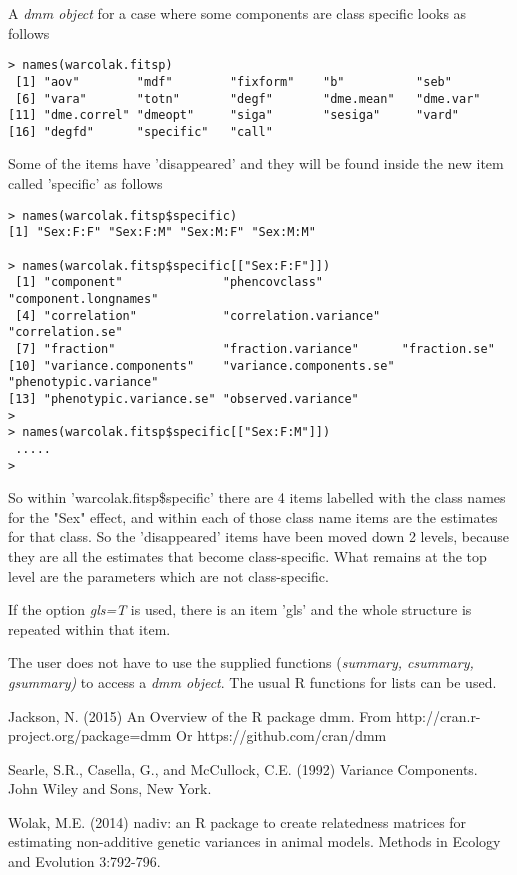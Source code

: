 \documentclass[titlepage]{article}  %
\begin{document}
A {\em dmm object} for a case where some components are class specific looks as follows
\begin{verbatim}
> names(warcolak.fitsp)
 [1] "aov"        "mdf"        "fixform"    "b"          "seb"       
 [6] "vara"       "totn"       "degf"       "dme.mean"   "dme.var"   
[11] "dme.correl" "dmeopt"     "siga"       "sesiga"     "vard"      
[16] "degfd"      "specific"   "call"  
\end{verbatim}
Some of the items have 'disappeared' and they will be found inside the new item called 'specific' as follows
\begin{verbatim}
> names(warcolak.fitsp$specific)
[1] "Sex:F:F" "Sex:F:M" "Sex:M:F" "Sex:M:M"

> names(warcolak.fitsp$specific[["Sex:F:F"]])
 [1] "component"              "phencovclass"           "component.longnames"   
 [4] "correlation"            "correlation.variance"   "correlation.se"        
 [7] "fraction"               "fraction.variance"      "fraction.se"           
[10] "variance.components"    "variance.components.se" "phenotypic.variance"   
[13] "phenotypic.variance.se" "observed.variance"     
> 
> names(warcolak.fitsp$specific[["Sex:F:M"]])
 .....
>
\end{verbatim}
 So within 'warcolak.fitsp\$specific' there are 4 items labelled with the class names for the "Sex" effect, and within each of those class name items are the 
estimates for that class. So the 'disappeared' items have been moved down 2 levels, because they are all the estimates that become class-specific. What remains at the top level are the parameters which are not class-specific. 

If the option {\em gls=T} is used, there is an item 'gls' and the whole structure is repeated within that item.

The user does not have to use the supplied functions ({\em summary, csummary, gsummary)} to access a {\em dmm object}. The usual R functions for lists can be used.



\begin{thebibliography}{99}

Jackson, N. (2015) An Overview of the R package dmm.
    From http://cran.r-project.org/package=dmm 
    Or https://github.com/cran/dmm

Searle, S.R., Casella, G., and McCullock, C.E. (1992) Variance Components.
    John Wiley and Sons, New York.

Wolak, M.E. (2014) nadiv: an R package to create relatedness matrices for
    estimating non-additive genetic variances in animal models.
    Methods in Ecology and Evolution 3:792-796.
\end{thebibliography}
\end{document}

